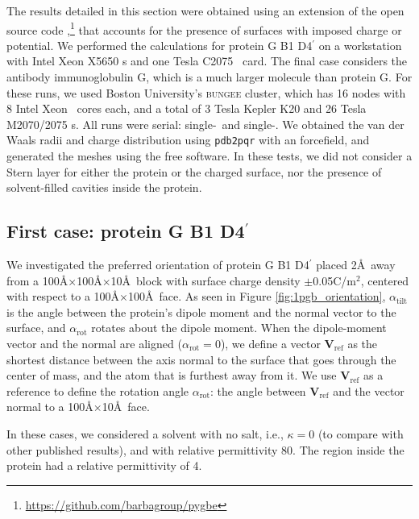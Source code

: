 
The results detailed in this section were obtained using an extension of the open source code \pygbe,\footnote{\url{https://github.com/barbagroup/pygbe}} that accounts for the presence of surfaces with imposed charge or potential.\cite{CooperBarba2015a}
We performed the calculations for protein G B1 D4$^\prime$ on a workstation with Intel Xeon X5650 \cpu s  and one \nvidia Tesla C2075 \gpu\ card. 
The final case considers the antibody immunoglobulin G, which is a much larger molecule than protein G. For these runs, we used Boston University's \textsc{bungee} cluster, which has 16 nodes with 8 Intel Xeon \cpu\ cores each, and a total of 3 \nvidia Tesla Kepler K20 and 26 \nvidia Tesla M2070/2075 \gpu s. All runs were serial: single-\cpu\ and single-\gpu. 
We obtained the van der Waals radii and charge distribution using \texttt{pdb2pqr}\cite{Dolinsky04} with an \amber forcefield, and generated the meshes using the free \msms software.\cite{SannerOlsonSpehner1995}
In these tests, we did not consider a Stern layer for either the protein or the charged surface, nor the presence of solvent-filled cavities inside the protein.

\subsection{First case: protein G B1 D4$^{\prime}$} \label{sec:PGB}

We investigated the preferred orientation of protein G B1 D4$^\prime$ placed 2\AA\ away from a 100\AA$\times$100\AA$\times$10\AA\ block with surface charge density $\pm$0.05C/m$^2$, centered with respect to a 100\AA$\times$100\AA\ face.
As seen in Figure \ref{fig:1pgb_orientation}, $\alpha_\text{tilt}$ is the angle between the protein's dipole moment and the normal vector to the surface, and $\alpha_\text{rot}$ rotates about the dipole moment. 
When the dipole-moment vector and the normal are aligned ($\alpha_\text{rot}=0$), we define a vector $\mathbf{V}_\text{ref}$ as the shortest distance between the axis normal to the surface that goes through the center of mass, and the atom that is furthest away from it. 
We use $\mathbf{V}_\text{ref}$ as a reference to define the rotation angle $\alpha_\text{rot}$: the angle between $\mathbf{V}_\text{ref}$ and the vector normal to a 100\AA$\times$10\AA\ face.  

In these cases, we considered a solvent with no salt, i.e., $\kappa=0$ (to compare with other published results), and with relative permittivity 80. The region inside the protein had a relative permittivity of 4.



